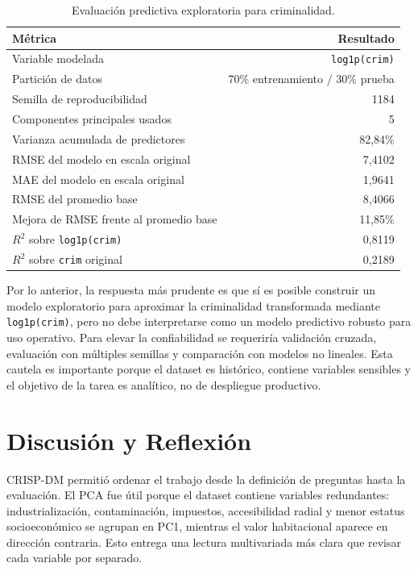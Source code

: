 \documentclass[10pt,a4paper]{article}
\begin{document}
\begin{table}[H]
  \centering
  \footnotesize
  \begin{tabular}{l r}
    \toprule
    \textbf{Métrica} & \textbf{Resultado} \\
    \midrule
    Variable modelada & \texttt{log1p(crim)} \\
    Partición de datos & 70\% entrenamiento / 30\% prueba \\
    Semilla de reproducibilidad & 1184 \\
    Componentes principales usados & 5 \\
    Varianza acumulada de predictores & 82,84\% \\
    RMSE del modelo en escala original & 7,4102 \\
    MAE del modelo en escala original & 1,9641 \\
    RMSE del promedio base & 8,4066 \\
    Mejora de RMSE frente al promedio base & 11,85\% \\
    $R^{2}$ sobre \texttt{log1p(crim)} & 0,8119 \\
    $R^{2}$ sobre \texttt{crim} original & 0,2189 \\
    \bottomrule
  \end{tabular}
  \caption{Evaluación predictiva exploratoria para criminalidad.}
  \label{tab:evaluacion_crim}
\end{table}

Por lo anterior, la respuesta más prudente es que sí es posible construir un modelo exploratorio para aproximar la criminalidad transformada mediante \texttt{log1p(crim)}, pero no debe interpretarse como un modelo predictivo robusto para uso operativo. Para elevar la confiabilidad se requeriría validación cruzada, evaluación con múltiples semillas y comparación con modelos no lineales. Esta cautela es importante porque el dataset es histórico, contiene variables sensibles y el objetivo de la tarea es analítico, no de despliegue productivo.

\section{Discusión y Reflexión}

CRISP-DM permitió ordenar el trabajo desde la definición de preguntas hasta la evaluación. El PCA fue útil porque el dataset contiene variables redundantes: industrialización, contaminación, impuestos, accesibilidad radial y menor estatus socioeconómico se agrupan en PC1, mientras el valor habitacional aparece en dirección contraria. Esto entrega una lectura multivariada más clara que revisar cada variable por separado.
\end{document}
